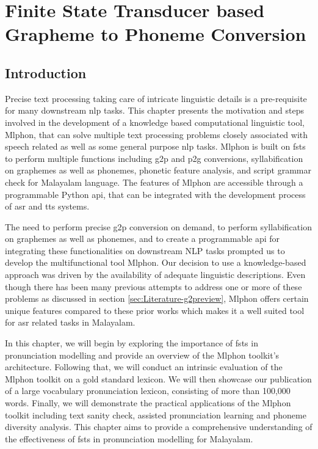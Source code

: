 \chapter{Finite State Transducer based Grapheme to Phoneme Conversion}
\label{ch:Mlphon} \graphicspath{{Figures/chapter4-Mlphon}}%

\section{Introduction}

Precise text processing taking care of intricate linguistic details is a
pre-requisite for many downstream \gls{nlp} tasks. This
chapter presents the motivation and steps involved in the
development of a knowledge based computational linguistic tool, Mlphon, that
can solve multiple text processing problems closely associated with speech
related as well as some general purpose \gls{nlp} tasks. Mlphon is built on \gls{fst}s to perform multiple functions including \gls{g2p} and \gls{p2g} conversions, syllabification on graphemes as well as phonemes, phonetic feature analysis, and script grammar check for Malayalam language. The features of Mlphon are accessible through a programmable Python \gls{api}, that can be integrated with the development process of \gls{asr} and \gls{tts} systems.

The need to perform precise \gls{g2p} conversion on demand, to
perform syllabification on graphemes as well as phonemes, and to create a
programmable \gls{api} for integrating these functionalities on downstream NLP tasks prompted us to  develop the multifunctional tool Mlphon. Our decision to use a knowledge-based approach was driven by the availability of adequate linguistic
descriptions. Even though there has been many previous attempts to address one
or more of these problems as discussed in section \ref{sec:Literature-g2preview}, Mlphon offers certain unique features compared to these prior works which makes it a well suited tool for \gls{asr} related tasks in Malayalam.

In this chapter, we will begin by exploring the importance of \gls{fst}s in pronunciation modelling and provide an overview of the Mlphon toolkit's architecture. Following that, we will conduct an intrinsic evaluation of the Mlphon toolkit on a gold standard lexicon. We will then showcase our publication of a large vocabulary pronunciation lexicon, consisting of more than 100,000 words. Finally, we will demonstrate the practical applications of the Mlphon toolkit including  text sanity check, assisted pronunciation learning and phoneme diversity analysis. This chapter aims to provide a comprehensive understanding of the effectiveness of \gls{fst}s in pronunciation modelling for Malayalam.

